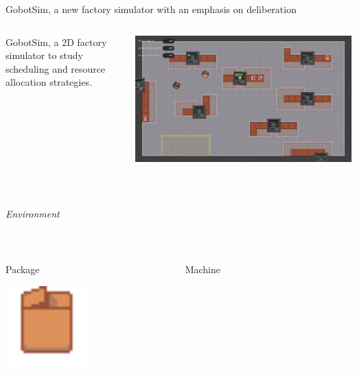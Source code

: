 \begin{frame}{GobotSim, a new factory simulator with an emphasis on deliberation}
    \begin{columns}
        \begin{column}{0.5\textwidth}
            GobotSim, a 2D factory simulator to study scheduling and resource allocation strategies.
        \end{column}
        \begin{column}{0.4\textwidth}
            \includegraphics[width=\linewidth]{images/gobot-rae.png}
        \end{column}
    \end{columns}
    
    ~~


    \centering
    \emph{Environment}

~~


    \begin{columns}
        \begin{column}{0.3\textwidth}
            \centering
            Package

            \includegraphics[width = 0.5\textwidth]{images/godot/package.png}
        \end{column}
        \begin{column}{0.3\textwidth}
            \centering
            Machine


\end{column}
\end{columns}
\end{frame}
